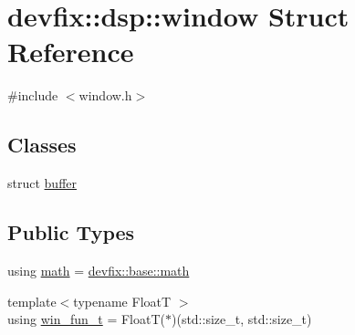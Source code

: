 \hypertarget{structdevfix_1_1dsp_1_1window}{}\section{devfix\+:\+:dsp\+:\+:window Struct Reference}
\label{structdevfix_1_1dsp_1_1window}


{\ttfamily \#include $<$window.\+h$>$}

\subsection*{Classes}
\begin{DoxyCompactItemize}
\item 
struct \hyperlink{structdevfix_1_1dsp_1_1window_1_1buffer}{buffer}
\end{DoxyCompactItemize}
\subsection*{Public Types}
\begin{DoxyCompactItemize}
\item 
using \hyperlink{structdevfix_1_1dsp_1_1window_a821ff669dee3e30555dcf32e7643dd0e}{math} = \hyperlink{structdevfix_1_1base_1_1math}{devfix\+::base\+::math}
\item 
{\footnotesize template$<$typename FloatT $>$ }\\using \hyperlink{structdevfix_1_1dsp_1_1window_ab2d2c0c5f5fca6dbcf91895115b69eac}{win\+\_\+fun\+\_\+t} = FloatT($\ast$)(std\+::size\+\_\+t, std\+::size\+\_\+t)
\end{DoxyCompactItemize}
